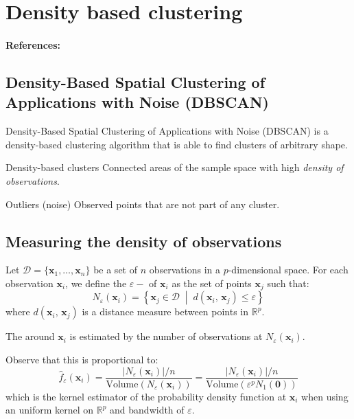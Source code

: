 \pagebreak
\section{Density based clustering}
\paragraph{References:} \cite{ester_density-based_1996}
\subsection{Density-Based Spatial Clustering of Applications with Noise (DBSCAN)}

Density-Based Spatial Clustering of Applications with Noise (DBSCAN) is
a density-based clustering algorithm that is able to find clusters of
arbitrary shape.

\begin{definition}{Density-based clusters}{}
	Connected areas of the sample space with high \emph{density of observations}.
\end{definition}

\begin{definition}{Outliers (noise)}{}
	Observed points that are not part of any cluster.
\end{definition}

\subsection{Measuring the density of observations}
Let $\mathcal{D} = \{ \boldsymbol{x}_1, \ldots, \boldsymbol{x}_n \}$ be a set of $n$ observations
in a $p$-dimensional space. For each observation $\boldsymbol{x}_i$, we define the $\varepsilon-$
of $\boldsymbol{x}_i$ as the set of points $\boldsymbol{x}_j$ such that:
\begin{equation*}
	N_{\varepsilon}(\boldsymbol{x}_i) = \left\{
	\boldsymbol{x}_j \in \mathcal{D} \;\middle|\; d(\boldsymbol{x}_i,\,\boldsymbol{x}_j) \leq \varepsilon
	\right\}
\end{equation*}
where $d(\boldsymbol{x}_i,\,\boldsymbol{x}_j)$ is a distance measure between points in $\mathds{R}^p$.

The  around $\boldsymbol{x}_i$ is estimated by the number
of observations at $N_{\varepsilon}(\boldsymbol{x}_i)$.

Observe that this is proportional to:
\begin{equation*}
	\hat{f}_\varepsilon(\boldsymbol{x}_i) =
	\frac{|N_{\varepsilon}(\boldsymbol{x}_i)| / n}{\text{Volume}(N_{\varepsilon}(\boldsymbol{x}_i))}
	= \frac{|N_{\varepsilon}(\boldsymbol{x}_i)| / n}{\text{Volume}(\varepsilon^p N_{1}(\boldsymbol{0}))}
\end{equation*}
which is the kernel estimator of the probability density function at $\boldsymbol{x}_i$
when using an uniform kernel on $\mathds{R}^p$ and bandwidth of $\varepsilon$.

